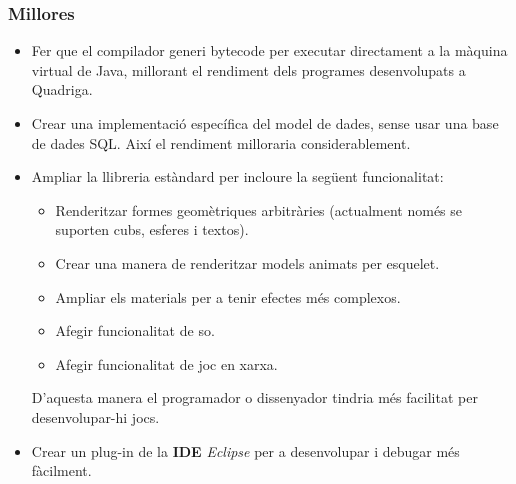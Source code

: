 \documentclass[serif,9pt]{beamer}
\begin{document}
  \begin{frame}\frametitle{Millores}
    \begin{itemize}
      \item Fer que el compilador generi bytecode per executar directament a la màquina virtual de Java, millorant el rendiment dels programes desenvolupats a Quadriga.\pause
      \item Crear una implementació específica del model de dades, sense usar una base de dades SQL. Així el rendiment milloraria considerablement.\pause
      \item Ampliar la llibreria estàndard per incloure la següent funcionalitat:\pause
      \begin{itemize}
        \item Renderitzar formes geomètriques arbitràries (actualment només se suporten cubs, esferes i textos).\pause
        \item Crear una manera de renderitzar models animats per esquelet.\pause
        \item Ampliar els materials per a tenir efectes més complexos.\pause
        \item Afegir funcionalitat de so.\pause
        \item Afegir funcionalitat de joc en xarxa.
      \end{itemize}\pause
      D'aquesta manera el programador o dissenyador tindria més facilitat per desenvolupar-hi jocs.\pause
      \item Crear un plug-in de la {\bf IDE} {\em Eclipse} per a desenvolupar i debugar més fàcilment.
    \end{itemize}
  \end{frame}

\begin{frame}
\frametitle{}
\titlepage
\end{frame}
\end{document}
